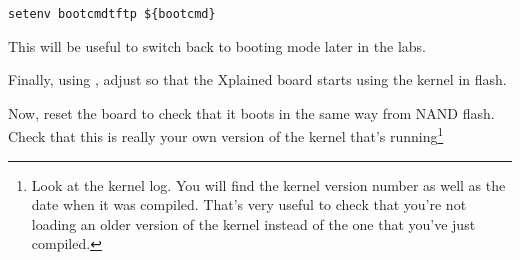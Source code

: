 {\begin{verbatim}
setenv bootcmdtftp ${bootcmd}
\end{verbatim}

This will be useful to switch back to  booting mode
later in the labs.

Finally, using ,
adjust  so that the Xplained board starts
using the kernel in flash.

Now, reset the board to check that it boots
in the same way from NAND flash. Check that this is really your own version of
the kernel that's running\footnote{Look at the kernel log. You will find
the kernel version number as well as the date when it was compiled.
That's very useful to check that you're not loading an older version
of the kernel instead of the one that you've just compiled.}
}
{}
